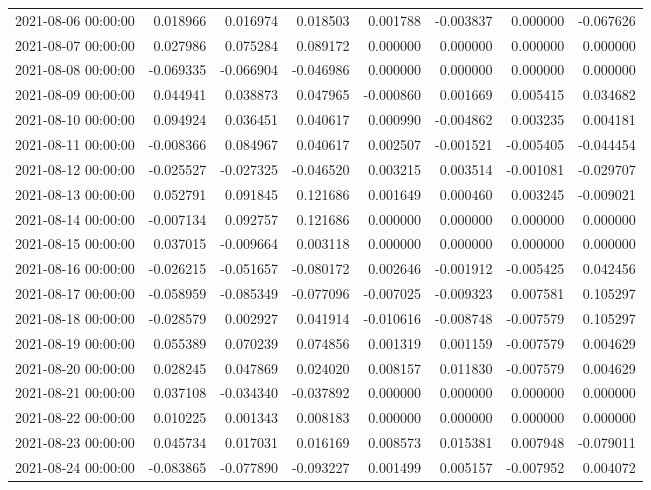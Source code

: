 \begin{tabular}{lrrrrrrr}
2021-08-06 00:00:00 & 0.018966 & 0.016974 & 0.018503 & 0.001788 & -0.003837 & 0.000000 & -0.067626 \\
2021-08-07 00:00:00 & 0.027986 & 0.075284 & 0.089172 & 0.000000 & 0.000000 & 0.000000 & 0.000000 \\
2021-08-08 00:00:00 & -0.069335 & -0.066904 & -0.046986 & 0.000000 & 0.000000 & 0.000000 & 0.000000 \\
2021-08-09 00:00:00 & 0.044941 & 0.038873 & 0.047965 & -0.000860 & 0.001669 & 0.005415 & 0.034682 \\
2021-08-10 00:00:00 & 0.094924 & 0.036451 & 0.040617 & 0.000990 & -0.004862 & 0.003235 & 0.004181 \\
2021-08-11 00:00:00 & -0.008366 & 0.084967 & 0.040617 & 0.002507 & -0.001521 & -0.005405 & -0.044454 \\
2021-08-12 00:00:00 & -0.025527 & -0.027325 & -0.046520 & 0.003215 & 0.003514 & -0.001081 & -0.029707 \\
2021-08-13 00:00:00 & 0.052791 & 0.091845 & 0.121686 & 0.001649 & 0.000460 & 0.003245 & -0.009021 \\
2021-08-14 00:00:00 & -0.007134 & 0.092757 & 0.121686 & 0.000000 & 0.000000 & 0.000000 & 0.000000 \\
2021-08-15 00:00:00 & 0.037015 & -0.009664 & 0.003118 & 0.000000 & 0.000000 & 0.000000 & 0.000000 \\
2021-08-16 00:00:00 & -0.026215 & -0.051657 & -0.080172 & 0.002646 & -0.001912 & -0.005425 & 0.042456 \\
2021-08-17 00:00:00 & -0.058959 & -0.085349 & -0.077096 & -0.007025 & -0.009323 & 0.007581 & 0.105297 \\
2021-08-18 00:00:00 & -0.028579 & 0.002927 & 0.041914 & -0.010616 & -0.008748 & -0.007579 & 0.105297 \\
2021-08-19 00:00:00 & 0.055389 & 0.070239 & 0.074856 & 0.001319 & 0.001159 & -0.007579 & 0.004629 \\
2021-08-20 00:00:00 & 0.028245 & 0.047869 & 0.024020 & 0.008157 & 0.011830 & -0.007579 & 0.004629 \\
2021-08-21 00:00:00 & 0.037108 & -0.034340 & -0.037892 & 0.000000 & 0.000000 & 0.000000 & 0.000000 \\
2021-08-22 00:00:00 & 0.010225 & 0.001343 & 0.008183 & 0.000000 & 0.000000 & 0.000000 & 0.000000 \\
2021-08-23 00:00:00 & 0.045734 & 0.017031 & 0.016169 & 0.008573 & 0.015381 & 0.007948 & -0.079011 \\
2021-08-24 00:00:00 & -0.083865 & -0.077890 & -0.093227 & 0.001499 & 0.005157 & -0.007952 & 0.004072 \\

\end{tabular}
